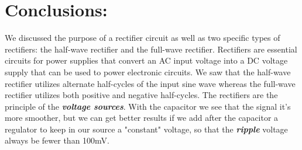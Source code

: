 \section{Conclusions:}

We discussed the purpose of a rectifier circuit as well as two specific types of rectifiers: the half-wave rectifier and the full-wave rectifier. Rectifiers are essential circuits for power supplies that convert an AC input voltage into a DC voltage supply that can be used to power electronic circuits. We saw that the half-wave rectifier utilizes alternate half-cycles of the input sine wave whereas the full-wave rectifier utilizes both positive and negative half-cycles. The rectifiers are the principle of the {\bfseries\itshape voltage sources}. With the capacitor we see that the signal it's more smoother, but we can get better results if we add after the capacitor a regulator to keep in our source a "constant" voltage, so that the {\bfseries\itshape ripple} voltage always be fewer than 100mV. \hfill \break

{\bfseries\itshape\color{OliveGreen}{Observation:}} {\itshape{}}

\pagebreak